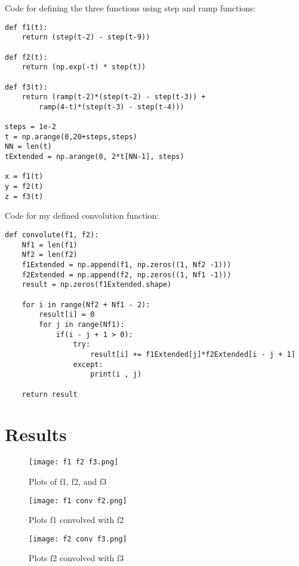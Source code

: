 \documentclass[12pt]{article}
\begin{document}
Code for defining the three functions using step and ramp functions:

\begin{lstlisting}
def f1(t):
    return (step(t-2) - step(t-9))
    
def f2(t):
    return (np.exp(-t) * step(t))

def f3(t):
    return (ramp(t-2)*(step(t-2) - step(t-3)) + 
        ramp(4-t)*(step(t-3) - step(t-4)))

steps = 1e-2
t = np.arange(0,20+steps,steps)
NN = len(t)
tExtended = np.arange(0, 2*t[NN-1], steps)

x = f1(t)
y = f2(t)
z = f3(t)
\end{lstlisting}

Code for my defined convolution function:

\begin{lstlisting}
def convolute(f1, f2):
    Nf1 = len(f1)
    Nf2 = len(f2)
    f1Extended = np.append(f1, np.zeros((1, Nf2 -1)))
    f2Extended = np.append(f2, np.zeros((1, Nf1 -1)))
    result = np.zeros(f1Extended.shape)
    
    for i in range(Nf2 + Nf1 - 2):
        result[i] = 0
        for j in range(Nf1):
            if(i - j + 1 > 0):
                try:
                    result[i] += f1Extended[j]*f2Extended[i - j + 1]
                except:
                    print(i , j)
    
    return result
\end{lstlisting}

\newpage

\section{Results}

\begin{figure}[h!]
    \centering
    \texttt{[image: f1 f2 f3.png]}
    \caption{Plots of f1, f2, and f3}
\end{figure}

\begin{figure}[h!]
    \centering
    \texttt{[image: f1 conv f2.png]}
    \caption{Plots f1 convolved with f2}
\end{figure}

\begin{figure}[h!]
    \centering
    \texttt{[image: f2 conv f3.png]}
    \caption{Plots f2 convolved with f3}
\end{figure}
\end{document}
